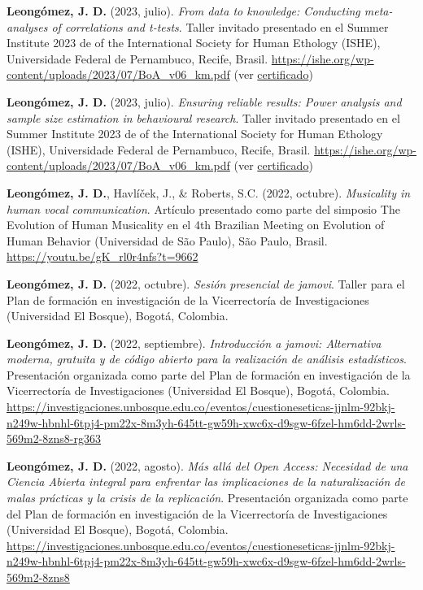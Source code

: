 \documentclass[11pt,a4paper,]{awesome-cv}
\begin{document}
\textbf{Leongómez, J. D.} (2023, julio). \emph{From data to knowledge:
Conducting meta-analyses of correlations and t-tests}. Taller invitado
presentado en el Summer Institute 2023 de of the International Society
for Human Ethology (ISHE), Universidade Federal de Pernambuco, Recife,
Brasil. \url{https://ishe.org/wp-content/uploads/2023/07/BoA_v06_km.pdf}
(ver
\href{https://jdleongomez.info/es/files/Cert_ISHE_2023.pdf}{certificado})

\textbf{Leongómez, J. D.} (2023, julio). \emph{Ensuring reliable
results: Power analysis and sample size estimation in behavioural
research}. Taller invitado presentado en el Summer Institute 2023 de of
the International Society for Human Ethology (ISHE), Universidade
Federal de Pernambuco, Recife, Brasil.
\url{https://ishe.org/wp-content/uploads/2023/07/BoA_v06_km.pdf} (ver
\href{https://jdleongomez.info/es/files/Cert_ISHE_2023.pdf}{certificado})

\textbf{Leongómez, J. D.}, Havlíček, J., \& Roberts, S.C. (2022,
octubre). \emph{Musicality in human vocal communication}. Artículo
presentado como parte del simposio The Evolution of Human Musicality en
el 4th Brazilian Meeting on Evolution of Human Behavior (Universidad de
São Paulo), São Paulo, Brasil. \url{https://youtu.be/gK_rl0r4nfs?t=9662}

\textbf{Leongómez, J. D.} (2022, octubre). \emph{Sesión presencial de
jamovi}. Taller para el Plan de formación en investigación de la
Vicerrectoría de Investigaciones (Universidad El Bosque), Bogotá,
Colombia.

\textbf{Leongómez, J. D.} (2022, septiembre). \emph{Introducción a
jamovi: Alternativa moderna, gratuita y de código abierto para la
realización de análisis estadísticos}. Presentación organizada como
parte del Plan de formación en investigación de la Vicerrectoría de
Investigaciones (Universidad El Bosque), Bogotá, Colombia.
\url{https://investigaciones.unbosque.edu.co/eventos/cuestioneseticas-jjnlm-92bkj-n249w-hbnhl-6tpj4-pm22x-8m3yh-645tt-gw59h-xwc6x-d9sgw-6fzel-hm6dd-2wrls-569m2-8zns8-rg363}

\textbf{Leongómez, J. D.} (2022, agosto). \emph{Más allá del Open
Access: Necesidad de una Ciencia Abierta integral para enfrentar las
implicaciones de la naturalización de malas prácticas y la crisis de la
replicación}. Presentación organizada como parte del Plan de formación
en investigación de la Vicerrectoría de Investigaciones (Universidad El
Bosque), Bogotá, Colombia.
\url{https://investigaciones.unbosque.edu.co/eventos/cuestioneseticas-jjnlm-92bkj-n249w-hbnhl-6tpj4-pm22x-8m3yh-645tt-gw59h-xwc6x-d9sgw-6fzel-hm6dd-2wrls-569m2-8zns8}
\end{document}
